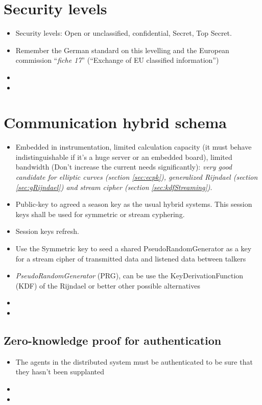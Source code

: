 \documentclass[10pt,a4paper,twoside]{llncs}
\begin{document}
%
\section{Security levels \label{sec:secLevel}}

\begin{itemize}
    \item Security levels: Open or unclassified, confidential, Secret, Top Secret.
    \item Remember the German standard on this levelling and the European commission ``\emph{fiche 17}'' (``Exchange of EU classified information'')
    \item
    \item
\end{itemize}

%
\section{Communication hybrid schema \label{sec:intercom}}

\begin{itemize}
    \item Embedded in instrumentation, limited calculation capacity (it must behave indistinguishable if it's a huge server or an embedded board), limited bandwidth (Don't increase the current needs significantly): \emph{very good candidate for elliptic curves (section \ref{sec:ecpk}), generalized Rijndael (section \ref{sec:gRijndael}) and stream cipher (section \ref{sec:kdfStreaming})}.
    \item Public-key to agreed a season key as the usual hybrid systems. This session keys shall be used for symmetric or stream cyphering.
    \item Session keys refresh.
    \item Use the Symmetric key to seed a shared PseudoRandomGenerator as a key for a stream cipher of transmitted data and listened data between talkers
    \item \emph{PseudoRandomGenerator} (PRG), can be use the KeyDerivationFunction (KDF) of the Rijndael or better other possible alternatives
    \item 
    \item 
\end{itemize}

%
\subsection{Zero-knowledge proof for authentication \label{sec:auth}}
\begin{itemize}
    \item The agents in the distributed system must be authenticated to be sure that they hasn't been supplanted
    \item 
    \item 
\end{itemize}
\end{document}
